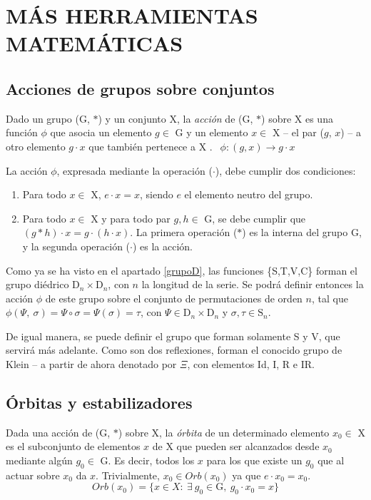 	\chapter{MÁS HERRAMIENTAS MATEMÁTICAS}	
	\section{Acciones de grupos sobre conjuntos}
		Dado un grupo (G, $*$) y un conjunto X, la \emph{acción} de (G, $*$) sobre X es una función $\phi$ que asocia un elemento $g \in$ G y un elemento $x \in$ X -- el par ($g$, $x$) -- a otro elemento $g\cdot x$ que también pertenece a X \cite{armstrong}. $\ \ \phi :(g,x) \to g\cdot x$
	
		La acción $\phi$, expresada mediante la operación ($\cdot$), debe cumplir dos condiciones:
		\begin{enumerate}
			\item{Para todo $x\in$ X, $e\cdot x=x$, siendo $e$ el elemento neutro del grupo.}
		
			\item{Para todo $x\in$ X y para todo par $g,h\in$ G, se debe cumplir que $(g*h)\cdot x=g\cdot (h\cdot x)$. La primera operación ($*$) es la interna del grupo G, y la segunda operación ($\cdot$) es la acción.}
		\end{enumerate}
		Como ya se ha visto en el apartado \ref{grupoD}, las funciones \{S,T,V,C\} forman el grupo diédrico $\text{D}_{n}\times\text{D}_{n}$, con $n$ la longitud de la serie. Se podrá definir entonces la acción $\phi$ de este grupo sobre el conjunto de permutaciones de orden $n$, tal que $\phi(\Psi,\ \sigma)=\Psi\circ\sigma=\Psi(\sigma)=\tau$, con $\Psi\in\text{D}_{n}\times\text{D}_{n}$ y $\sigma,\tau\in\text{S}_n$.
		
		De igual manera, se puede definir el grupo que forman solamente S y V, que servirá más adelante. Como son dos reflexiones, forman el conocido grupo de Klein -- a partir de ahora denotado por $\Xi$, con elementos Id, I, R e IR.

	\section{Órbitas y estabilizadores}	
		Dada una acción de (G, $*$) sobre X, la \emph{órbita} de un determinado elemento $x_0\in$ X es el subconjunto de elementos $x$ de X que pueden ser alcanzados desde $x_0$ mediante algún $g_0\in$ G. Es decir, todos los $x$ para los que existe un $g_0$ que al actuar sobre $x_0$ da $x$. Trivialmente, $x_0\in Orb(x_0)$ ya que $e\cdot x_0=x_0$.
		\[Orb(x_0)=\{x\in X :\ \exists \ g_0\in \text{G},\ g_0\cdot x_0 =x\}\]
	
